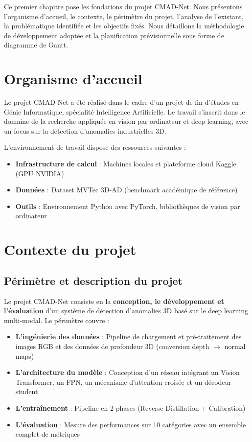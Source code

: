 \documentclass[12pt,a4paper,oneside]{report}
\begin{document}
Ce premier chapitre pose les fondations du projet CMAD-Net. Nous présentons l'organisme d'accueil, le contexte, le périmètre du projet, l'analyse de l'existant, la problématique identifiée et les objectifs fixés. Nous détaillons la méthodologie de développement adoptée et la planification prévisionnelle sous forme de diagramme de Gantt.

\section{Organisme d'accueil}

Le projet CMAD-Net a été réalisé dans le cadre d'un projet de fin d'études en Génie Informatique, spécialité Intelligence Artificielle. Le travail s'inscrit dans le domaine de la recherche appliquée en vision par ordinateur et deep learning, avec un focus sur la détection d'anomalies industrielles 3D.

L'environnement de travail dispose des ressources suivantes :
\begin{itemize}
    \item \textbf{Infrastructure de calcul} : Machines locales et plateforme cloud Kaggle (GPU NVIDIA)
    \item \textbf{Données} : Dataset MVTec 3D-AD (benchmark académique de référence)
    \item \textbf{Outils} : Environnement Python avec PyTorch, bibliothèques de vision par ordinateur
\end{itemize}

\section{Contexte du projet}

\subsection{Périmètre et description du projet}

Le projet CMAD-Net consiste en la \textbf{conception, le développement et l'évaluation} d'un système de détection d'anomalies 3D basé sur le deep learning multi-modal. Le périmètre couvre :

\begin{itemize}
    \item \textbf{L'ingénierie des données} : Pipeline de chargement et pré-traitement des images RGB et des données de profondeur 3D (conversion depth $\rightarrow$ normal maps)
    \item \textbf{L'architecture du modèle} : Conception d'un réseau intégrant un Vision Transformer, un FPN, un mécanisme d'attention croisée et un décodeur student
    \item \textbf{L'entraînement} : Pipeline en 2 phases (Reverse Distillation + Calibration)
    \item \textbf{L'évaluation} : Mesure des performances sur 10 catégories avec un ensemble complet de métriques
\end{itemize}
\end{document}
